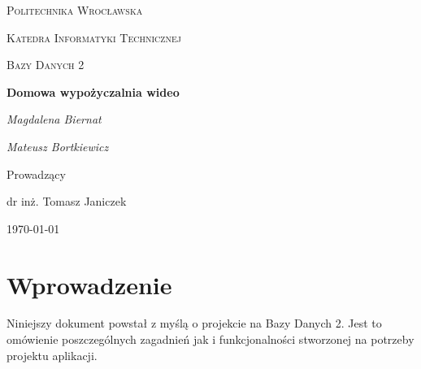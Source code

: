 \documentclass{article}
\begin{document}
	
	\begin{titlepage}
		\centering
		{\scshape\LARGE Politechnika Wrocławska \par}
		{\scshape\Large Katedra Informatyki Technicznej\par}
		\vspace{1cm}
		{\scshape\Large Bazy Danych 2\par}
		\vspace{1.5cm}
		{\huge\bfseries Domowa wypożyczalnia wideo\par}
		\vspace{2cm}
		{\Large\itshape Magdalena Biernat\par}
		{\Large\itshape Mateusz Bortkiewicz\par}
		\vfill\flushleft\large
		
		\normalsize	\centering	\vspace{3cm}
		Prowadzący\par
		dr inż. Tomasz Janiczek 
		
		\vfill
		{\large \today\par}
	\end{titlepage}
	\newpage
	\tableofcontents
	\newpage
		\section{Wprowadzenie}
	Niniejszy dokument powstał z myślą o projekcie na Bazy Danych 2. Jest to omówienie poszczególnych zagadnień jak i funkcjonalności stworzonej na potrzeby projektu aplikacji. 
\end{document}
